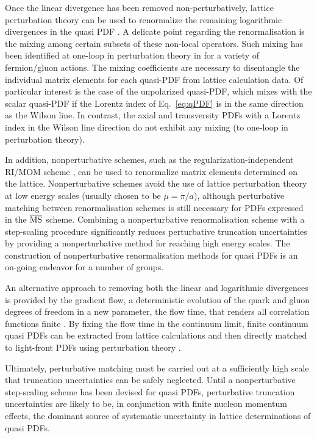 Once the linear divergence has been removed non-perturbatively, lattice perturbation theory can be used to renormalize the remaining logarithmic divergences in the quasi PDF \cite{Ishikawa:2016znu, Carlson:2017gpk}. A delicate point regarding the renormalisation is the mixing among certain subsets of these non-local operators. Such mixing has been identified at one-loop in perturbation theory in \cite{Constantiou:2017soon} for a variety of fermion/gluon actions. The mixing coefficients are necessary to disentangle the individual matrix elements for each quasi-PDF from lattice calculation data. Of particular interest is the case of the unpolarized quasi-PDF, which mixes with the scalar quasi-PDF if the Lorentz index of Eq.~\eqref{eq:qPDF} is in the same direction as the Wilson line. In contrast, the axial and transversity PDFs with a Lorentz index in the Wilson line direction do not exhibit any mixing (to one-loop in perturbation theory). 

In addition, nonperturbative schemes, such as the regularization-independent RI/MOM scheme \cite{Martinelli:1994ty}, can be used to renormalize matrix elements determined on the lattice. Nonperturbative schemes avoid the use of lattice perturbation theory at low energy scales (usually chosen to be $\mu = \pi/a$), although perturbative matching between renormalisation schemes is still necessary for PDFs expressed in the $\overline{\rm MS}$ scheme. Combining a nonperturbative renormalisation scheme with a step-scaling procedure \cite{Luscher:1991wu} significantly reduces perturbative truncation uncertainties by providing a nonperturbative method for reaching high energy scales. The construction of nonperturbative renormalisation methods for quasi PDFs is an on-going endeavor for a number of groups. 

An alternative approach to removing both the linear and logarithmic divergences is provided by the gradient flow, a deterministic evolution of the quark and gluon degrees of freedom in a new parameter, the flow time, that renders all correlation functions finite \cite{Narayanan:2006rf,Luscher:2011bx,Luscher:2013cpa}. By fixing the flow time in the continuum limit, finite continuum quasi PDFs can be extracted from lattice calculations and then directly matched to light-front PDFs using perturbation theory \cite{Monahan:2016bvm}.

Ultimately, perturbative matching must be carried out at a sufficiently high scale that truncation uncertainties can be safely neglected. Until a nonperturbative step-scaling scheme has been devised for quasi PDFs, perturbative truncation uncertainties are likely to be, in conjunction with finite nucleon momentum effects, the dominant source of systematic uncertainty in lattice determinations of quasi PDFs.




